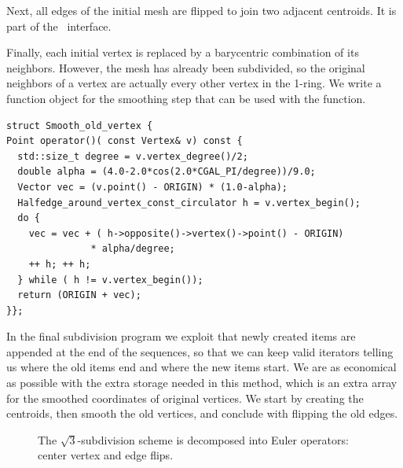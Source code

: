\noindent
Next, all edges of the initial mesh are flipped to join two
adjacent centroids. It is part of the \cgalpoly\ interface.

Finally, each initial vertex is replaced by a barycentric combination
of its neighbors. However, the mesh has already been subdivided, so
the original neighbors of a vertex are actually every other vertex in
the 1-ring. We write a function object for the smoothing step that
can be used with the  function.

\begin{lstlisting}
struct Smooth_old_vertex {
Point operator()( const Vertex& v) const {
  std::size_t degree = v.vertex_degree()/2;
  double alpha = (4.0-2.0*cos(2.0*CGAL_PI/degree))/9.0;
  Vector vec = (v.point() - ORIGIN) * (1.0-alpha);
  Halfedge_around_vertex_const_circulator h = v.vertex_begin();
  do {
    vec = vec + ( h->opposite()->vertex()->point() - ORIGIN) 
               * alpha/degree;
    ++ h; ++ h;
  } while ( h != v.vertex_begin());
  return (ORIGIN + vec);
}};
\end{lstlisting}%

\noindent
In the final subdivision program we exploit that newly created items
are appended at the end of the sequences, so that we can keep valid
iterators telling us where the old items end and where the new items
start. We are as economical as possible with the extra
storage needed in this method, which is an extra array for the
smoothed coordinates of original vertices. We start by creating the
centroids, then smooth the old vertices, and conclude with flipping
the old edges.

\begin{figure}[tb]
    \caption{The $\sqrt{3}$-subdivision scheme is decomposed into
             Euler operators: center vertex and edge flips.}
    \label{fig:sqrt3_basic}%
\end{figure}


